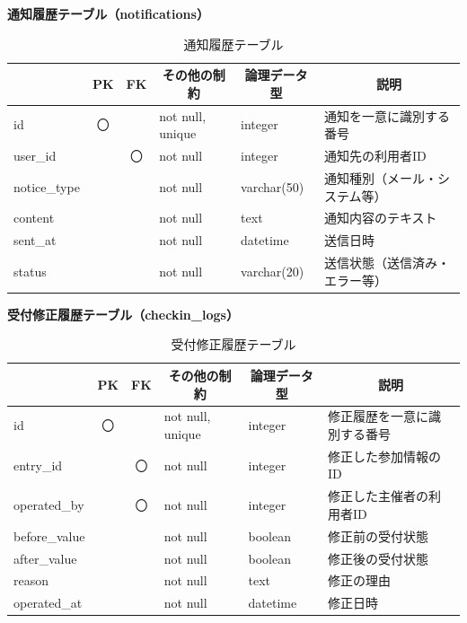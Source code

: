 \noindent\textbf{通知履歴テーブル（notifications）}
\begin{table}[H]
    \centering
    \caption{通知履歴テーブル}
    \label{tab:notifications_table}
    \begin{tabularx}{\linewidth}{|l|c|c|l|l|X|}
        \hline
        \rowcolor{tableblue}
        \multicolumn{1}{|c|}{カラム名} & \multicolumn{1}{c|}{PK} & \multicolumn{1}{c|}{FK} & \multicolumn{1}{c|}{その他の制約} & \multicolumn{1}{c|}{論理データ型} & \multicolumn{1}{c|}{説明} \\ \hline
        id & 〇 & & not null, unique & integer & 通知を一意に識別する番号 \\ \hline
        user\_id & & 〇 & not null & integer & 通知先の利用者ID \\ \hline
        notice\_type & & & not null & varchar(50) & 通知種別（メール・システム等） \\ \hline
        content & & & not null & text & 通知内容のテキスト \\ \hline
        sent\_at & & & not null & datetime & 送信日時 \\ \hline
        status & & & not null & varchar(20) & 送信状態（送信済み・エラー等） \\ \hline
    \end{tabularx}
\end{table}

\noindent\textbf{受付修正履歴テーブル（checkin\_logs）}
\begin{table}[H]
    \centering
    \caption{受付修正履歴テーブル}
    \label{tab:checkin_logs_table}
    \begin{tabularx}{\linewidth}{|l|c|c|l|l|X|}
        \hline
        \rowcolor{tableblue}
        \multicolumn{1}{|c|}{カラム名} & \multicolumn{1}{c|}{PK} & \multicolumn{1}{c|}{FK} & \multicolumn{1}{c|}{その他の制約} & \multicolumn{1}{c|}{論理データ型} & \multicolumn{1}{c|}{説明} \\ \hline
        id & 〇 & & not null, unique & integer & 修正履歴を一意に識別する番号 \\ \hline
        entry\_id & & 〇 & not null & integer & 修正した参加情報のID \\ \hline
        operated\_by & & 〇 & not null & integer & 修正した主催者の利用者ID \\ \hline
        before\_value & & & not null & boolean & 修正前の受付状態 \\ \hline
        after\_value & & & not null & boolean & 修正後の受付状態 \\ \hline
        reason & & & not null & text & 修正の理由 \\ \hline
        operated\_at & & & not null & datetime & 修正日時 \\ \hline
    \end{tabularx}
\end{table}

